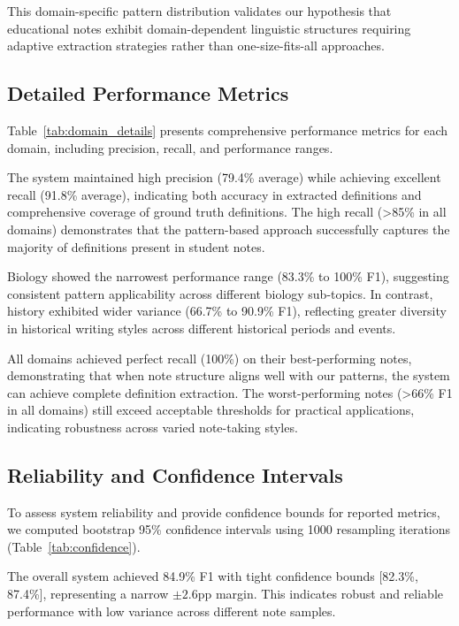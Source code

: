 This domain-specific pattern distribution validates our hypothesis that educational notes exhibit domain-dependent linguistic structures requiring adaptive extraction strategies rather than one-size-fits-all approaches.

\subsection{Detailed Performance Metrics}

Table~\ref{tab:domain_details} presents comprehensive performance metrics for each domain, including precision, recall, and performance ranges.



The system maintained high precision (79.4\% average) while achieving excellent recall (91.8\% average), indicating both accuracy in extracted definitions and comprehensive coverage of ground truth definitions. The high recall (>85\% in all domains) demonstrates that the pattern-based approach successfully captures the majority of definitions present in student notes.

Biology showed the narrowest performance range (83.3\% to 100\% F1), suggesting consistent pattern applicability across different biology sub-topics. In contrast, history exhibited wider variance (66.7\% to 90.9\% F1), reflecting greater diversity in historical writing styles across different historical periods and events.

All domains achieved perfect recall (100\%) on their best-performing notes, demonstrating that when note structure aligns well with our patterns, the system can achieve complete definition extraction. The worst-performing notes (>66\% F1 in all domains) still exceed acceptable thresholds for practical applications, indicating robustness across varied note-taking styles.

\subsection{Reliability and Confidence Intervals}

To assess system reliability and provide confidence bounds for reported metrics, we computed bootstrap 95\% confidence intervals using 1000 resampling iterations (Table~\ref{tab:confidence}).



The overall system achieved 84.9\% F1 with tight confidence bounds [82.3\%, 87.4\%], representing a narrow $\pm 2.6$pp margin. This indicates robust and reliable performance with low variance across different note samples.


